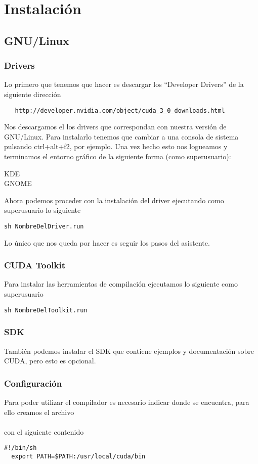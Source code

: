 \section{Instalación}
\subsection{GNU/Linux}
\subsubsection{Drivers}
Lo primero que tenemos que hacer es descargar los ``Developer Drivers'' de la siguiente dirección
  \begin{verbatim}
   http://developer.nvidia.com/object/cuda_3_0_downloads.html
  \end{verbatim}
Nos descargamos el los drivers que correspondan con nuestra versión de GNU/Linux.
Para instalarlo tenemos que cambiar a una consola de sistema pulsando ctrl+alt+f2, por ejemplo. Una vez hecho esto
nos logueamos y terminamos el entorno gráfico de la siguiente forma (como superusuario):
\begin{description}
 \item[KDE] 
 \item[GNOME] 
 \end{description}
Ahora podemos proceder con la instalación del driver ejecutando como superusuario lo siguiente
  \begin{lstlisting}[style=consola]
  sh NombreDelDriver.run
  \end{lstlisting}
Lo único que nos queda por hacer es seguir los pasos del asistente.

\subsubsection{CUDA Toolkit}
Para instalar las herramientas de compilación ejecutamos lo siguiente como superusuario
  \begin{lstlisting}[style=consola]
  sh NombreDelToolkit.run
  \end{lstlisting}

\subsubsection{SDK}
También podemos instalar el SDK que contiene ejemplos y documentación sobre CUDA, pero esto es opcional.
\subsubsection{Configuración}
Para poder utilizar el compilador  es necesario indicar donde se encuentra, para ello creamos el
archivo\\
\\
con el siguiente contenido
  \begin{lstlisting}[style=BASH]
  #!/bin/sh
  export PATH=$PATH:/usr/local/cuda/bin
  \end{lstlisting}

